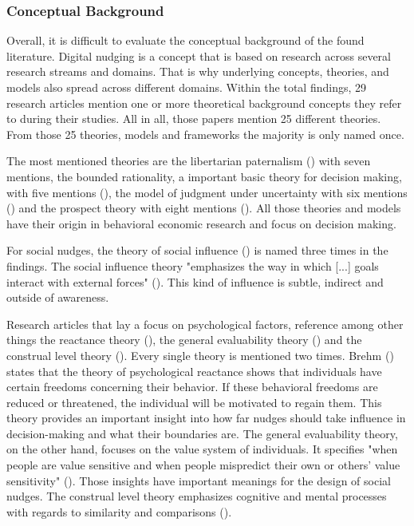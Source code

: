 \subsubsection{Conceptual Background} 
Overall, it is difficult to evaluate the conceptual background of the found literature. Digital nudging is a concept that is based on research across several research streams and domains. That is why underlying concepts, theories, and models also spread across different domains. Within the total findings, 29 research articles mention one or more theoretical background concepts they refer to during their studies. All in all, those papers mention 25 different theories. From those 25 theories, models and frameworks the majority is only named once. 

The most mentioned theories are the libertarian paternalism (\cite{thaler_nudge:_2009}) with seven mentions, the bounded rationality, a important basic theory for decision making, with five mentions (\cite{simon_behavioral_1955}), the model of judgment under uncertainty with six mentions (\cite{tversky_judgment_1974}) and the prospect theory with eight mentions (\cite{kahneman_prospect_1979}). All those theories and models have their origin in behavioral economic research and focus on decision making.

For social nudges, the theory of social influence (\cite{cialdini_social_2004}) is named three times in the findings. The social influence theory "emphasizes the way in which [...] goals interact with external forces" (\cite[p.591]{cialdini_social_2004}). This kind of influence is subtle, indirect and outside of awareness.

Research articles that lay a focus on psychological factors, reference among other things the reactance theory (\cite{brehm_theory_1966}), the general evaluability theory (\cite{hsee_general_2010}) and the construal level theory (\cite{trope_construal-level_2010}). Every single theory is mentioned two times. Brehm (\citeyear{brehm_theory_1966}) states that the theory of psychological reactance shows that individuals have certain freedoms concerning their behavior. If these behavioral freedoms are reduced or threatened, the individual will be motivated to regain them. This theory provides an important insight into how far nudges should take influence in decision-making and what their boundaries are. The general evaluability theory, on the other hand, focuses on the value system of individuals. It specifies "when people are value sensitive and when people mispredict their own or others' value sensitivity" (\cite[p.343]{hsee_general_2010}). Those insights have important meanings for the design of social nudges. The construal level theory emphasizes cognitive and mental processes with regards to similarity and comparisons (\cite{trope_construal-level_2010}).


